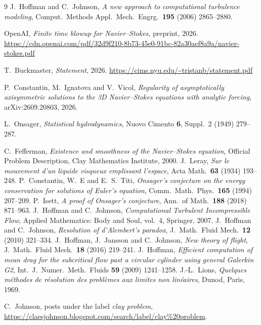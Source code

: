 \documentclass[11pt]{article}
\begin{document}
\begin{thebibliography}{9}
 J.~Hoffman and C.~Johnson, \emph{A new approach to computational turbulence
modeling}, Comput.\ Methods Appl.\ Mech.\ Engrg.\ \textbf{195} (2006) 2865--2880.

 OpenAI, \emph{Finite time blowup for Navier--Stokes}, preprint, 2026.
\newblock \url{https://cdn.openai.com/pdf/32d9f210-8b73-45e0-91bc-82a30aef8a9a/navier-stokes.pdf}

 T.~Buckmaster, \emph{Statement}, 2026.
\newblock \url{https://cims.nyu.edu/~tristanb/statement.pdf}

 P.~Constantin, M.~Ignatova and V.~Vicol, \emph{Regularity of asymptotically
axisymmetric solutions to the 3D Navier--Stokes equations with analytic forcing},
arXiv:2609.20803, 2026.

 L.~Onsager, \emph{Statistical hydrodynamics}, Nuovo Cimento \textbf{6},
Suppl.~2 (1949) 279--287.

 C.~Fefferman, \emph{Existence and smoothness of the Navier--Stokes equation},
Official Problem Description, Clay Mathematics Institute, 2000.
 J.~Leray, \emph{Sur le mouvement d'un liquide visqueux emplissant l'espace},
Acta Math.\ \textbf{63} (1934) 193--248.
 P.~Constantin, W.~E and E.~S.~Titi, \emph{Onsager's conjecture on the energy
conservation for solutions of Euler's equation}, Comm.\ Math.\ Phys.\ \textbf{165} (1994) 207--209.
 P.~Isett, \emph{A proof of Onsager's conjecture}, Ann.\ of Math.\ \textbf{188}
(2018) 871--963.
 J.~Hoffman and C.~Johnson, \emph{Computational Turbulent Incompressible Flow},
Applied Mathematics: Body and Soul, vol.~4, Springer, 2007.
 J.~Hoffman and C.~Johnson, \emph{Resolution of d'Alembert's paradox},
J.\ Math.\ Fluid Mech.\ \textbf{12} (2010) 321--334.
 J.~Hoffman, J.~Jansson and C.~Johnson, \emph{New theory of flight},
J.\ Math.\ Fluid Mech.\ \textbf{18} (2016) 219--241.
 J.~Hoffman, \emph{Efficient computation of mean drag for the subcritical flow past a
circular cylinder using general Galerkin G2}, Int.\ J.\ Numer.\ Meth.\ Fluids \textbf{59} (2009)
1241--1258.
 J.-L.~Lions, \emph{Quelques m\'ethodes de r\'esolution des probl\`emes aux
limites non lin\'eaires}, Dunod, Paris, 1969.

 C.~Johnson, posts under the label \emph{clay problem},
\url{https://claesjohnson.blogspot.com/search/label/clay\%20problem}.
\end{thebibliography}
\end{document}

